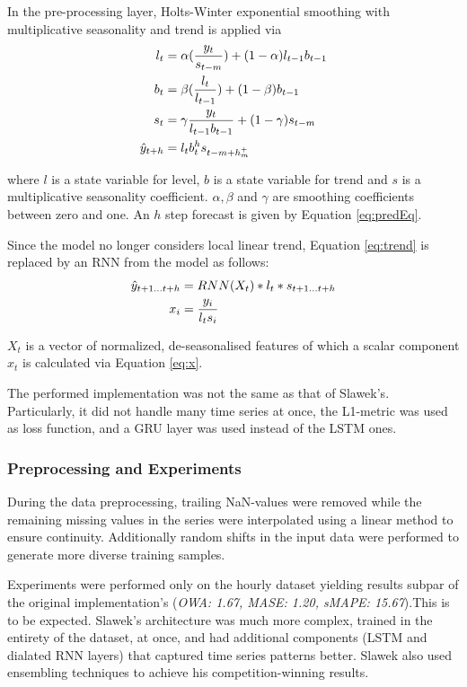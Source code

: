 \documentclass[conference]{IEEEtran}
\begin{document}
In the pre-processing layer, Holts-Winter exponential smoothing\cite{winters} with multiplicative seasonality and trend is applied via
\begin{align}
    l_t &= \alpha(\frac{y_t}{s_{t-m}}) + (1 - \alpha)l_{t-1} b_{t-1} \label{eq:level}\\
    b_t &= \beta(\frac{l_t}{l_{t-1}}) + (1- \beta) b_{t-1} \label{eq:trend} \\ 
    s_{t} &= \gamma \frac{y_t}{l_{t-1} b_{t-1}} + (1-\gamma)s_{t-m} \label{eq:season}\\
    \Hat{y}_{t+h} &= l_t  b_t^h s_{t-m+h^+_m} \label{eq:predEq}
\end{align}

where $l$ is a state variable for level, $b$ is a state variable for trend and $s$ is a multiplicative seasonality coefficient. $\alpha, \beta$ and $\gamma$ are smoothing coefficients between zero and one. An $h$ step forecast is given by Equation \ref{eq:predEq}.

Since the model no longer considers local linear trend, Equation \ref{eq:trend} is replaced by an RNN from the model as follows:
\begin{align}
    \Hat{y}_{t+1 \dots t+h} &= RNN(X_t) * l_t * s_{t+1 \dots t+h} \label{eq:modifiedEq}\\
    x_i &= \frac{y_i}{l_t s_i} \label{eq:x}
\end{align}

$X_t$ is a vector of normalized, de-seasonalised features of which a scalar component $x_t$ is calculated via Equation \ref{eq:x}.

The performed implementation was not the same as that of Slawek's\cite{esrnn}. Particularly, it did not handle many time series at once, the L1-metric was used as loss function, and a GRU layer was used instead of the LSTM ones.

\subsubsection{Preprocessing and Experiments}

During the data preprocessing, trailing NaN-values were removed while the remaining missing values in the series were interpolated using a linear method to ensure continuity. Additionally random shifts in the input data were performed to generate more diverse training samples.

Experiments were performed only on the hourly dataset yielding results subpar of the original implementation's (\textit{OWA: 1.67, MASE: 1.20, sMAPE: 15.67}).This is to be expected. Slawek's\cite{esrnn} architecture was much more complex, trained in the entirety of the dataset, at once, and had additional components (LSTM and dialated RNN layers) that captured time series patterns better. Slawek also used ensembling techniques to achieve his competition-winning results.
\end{document}
